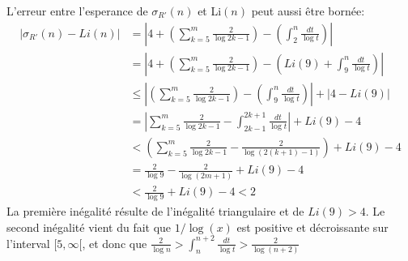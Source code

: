 \documentclass[../main.tex]{report}
\begin{document}
%

L'erreur entre l'esperance de $\sigma_{R'}(n)$ et Li$(n)$ peut aussi être bornée:
\[ \begin{aligned}
\left| \sigma_{R'}(n) - Li(n) \right|
&= \left| 4 + \left(\sum_{k=5}^m \frac{2}{\log 2k-1}\right)
		- \left(\int_2^n \frac{dt}{\log t} \right) \right| \\
&= \left| 4 + \left(\sum_{k=5}^m \frac{2}{\log 2k-1}\right)
		- \left(Li(9) + \int_9^n \frac{dt}{\log t} \right) \right| \\
&\leq \left| \left(\sum_{k=5}^m \frac{2}{\log 2k-1}\right)
		- \left(\int_9^n \frac{dt}{\log t} \right) \right| + \left| 4 - Li(9)\right| \\
&= \left| \sum_{k=5}^m \frac{2}{\log 2k - 1} - 
		\int_{2k-1}^{2k+1} \frac{dt}{\log t} \right| + Li(9) - 4 \\ 
&< \left(\sum_{k=5}^m \frac{2}{\log 2k-1} - \frac{2}{\log{(2(k+1)-1)}}\right)
		+ Li(9) - 4 \\
&= \frac{2}{\log 9} - \frac{2}{\log (2m + 1)} + Li(9) - 4 \\
&< \frac{2}{\log 9} + Li(9) - 4	< 2		
\end{aligned} \]
La première inégalité résulte de l'inégalité triangulaire et de $Li(9) > 4$. Le second inégalité vient du fait que $1/\log(x)$ est positive et décroissante sur l'interval $[5,\infty[$, 
et donc que $\frac{2}{\log n} > \int_n^{n+2}\frac{dt}{\log t} > \frac{2}{\log (n+2)}$
\end{document}
